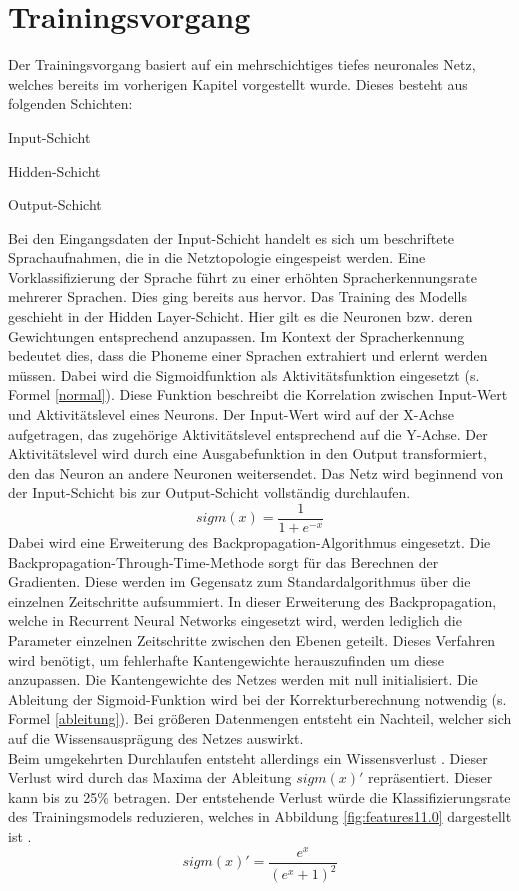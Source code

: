 \section{Trainingsvorgang}

Der Trainingsvorgang basiert auf ein mehrschichtiges tiefes neuronales Netz, welches bereits im vorherigen Kapitel vorgestellt wurde. Dieses besteht aus folgenden Schichten:
\begin{description}
	\item Input-Schicht
	\item Hidden-Schicht 
	\item Output-Schicht
\end{description}
Bei den Eingangsdaten der Input-Schicht handelt es sich um beschriftete Sprachaufnahmen, die in die Netztopologie eingespeist werden. Eine Vorklassifizierung der Sprache führt zu einer erhöhten Spracherkennungsrate mehrerer Sprachen. Dies ging bereits aus {\cite{bishop.2006}} hervor. Das Training des Modells geschieht in der Hidden Layer-Schicht. Hier gilt es die Neuronen bzw. deren Gewichtungen entsprechend anzupassen. Im Kontext der Spracherkennung bedeutet dies, dass die Phoneme einer Sprachen extrahiert und erlernt werden müssen. Dabei wird die Sigmoidfunktion als Aktivitätsfunktion eingesetzt (s. Formel \ref{normal}). Diese Funktion beschreibt die Korrelation zwischen Input-Wert und  Aktivitätslevel eines Neurons. 
Der Input-Wert wird auf der X-Achse aufgetragen, das zugehörige Aktivitätslevel entsprechend auf die Y-Achse. Der Aktivitätslevel wird durch eine Ausgabefunktion in den Output transformiert, den das Neuron an andere Neuronen weitersendet\cite{Neuronal31:online}. Das Netz wird beginnend von der Input-Schicht bis zur Output-Schicht vollständig durchlaufen.  
\begin{equation}
sigm(x)=\frac{ 1 }{1+e^{-x}  }
\label{normal}
\end{equation}
Dabei wird eine Erweiterung des Backpropagation-Algorithmus eingesetzt. Die Backpropagation-Through-Time-Methode sorgt für das Berechnen der Gradienten. Diese werden im Gegensatz zum Standardalgorithmus über die einzelnen Zeitschritte aufsummiert. In dieser Erweiterung des Backpropagation, welche in Recurrent Neural Networks eingesetzt wird, werden lediglich die Parameter einzelnen Zeitschritte zwischen den Ebenen geteilt. Dieses Verfahren wird benötigt, um fehlerhafte Kantengewichte herauszufinden um diese anzupassen. Die Kantengewichte des Netzes werden mit null initialisiert. Die Ableitung der Sigmoid-Funktion wird bei der Korrekturberechnung notwendig (s. Formel \ref{ableitung}). Bei größeren Datenmengen entsteht ein Nachteil, welcher sich auf die Wissensausprägung des Netzes auswirkt. 
\\
Beim umgekehrten Durchlaufen entsteht allerdings ein Wissensverlust \cite{bishop.2006}. Dieser Verlust wird durch das Maxima der Ableitung $sigm(x)'$ repräsentiert. Dieser kann bis zu 25\% betragen. Der entstehende Verlust würde die Klassifizierungsrate des Trainingsmodels reduzieren, welches in Abbildung \ref{fig:features11.0} dargestellt ist \cite{Kulbear.2017}.
\begin{equation}
sigm(x)'= \frac{ e^{x} }{(e^{x} +1)^2  }
\label{ableitung}
\end{equation}

